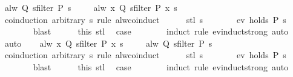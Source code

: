 \begin{isabellebody}
\ {\isachardoublequoteopen}alw\ Q\ {\isacharparenleft}sfilter\ P\ s{\isacharparenright}{\isachardoublequoteclose}\ \isamarkupfalse%
\ {\isacharasterisk}\ \isamarkupfalse%
\ {\isachardoublequoteopen}alw\ {\isacharparenleft}{\isasymlambda}x{\isachardot}\ Q\ {\isacharparenleft}sfilter\ P\ x{\isacharparenright}{\isacharparenright}\ s{\isachardoublequoteclose}\isanewline
\ \ \isamarkupfalse%
\ {\isacharparenleft}coinduction\ arbitrary{\isacharcolon}\ s\ rule{\isacharcolon}\ alw{\isacharunderscore}coinduct{\isacharparenright}\isanewline
\ \ \ \ \isamarkupfalse%
\ {\isacharparenleft}stl\ s{\isacharparenright}\isanewline
\ \ \ \ \isamarkupfalse%
\ \isamarkupfalse%
\ {\isachardoublequoteopen}ev\ {\isacharparenleft}holds\ P{\isacharparenright}\ s{\isachardoublequoteclose}\isanewline
\ \ \ \ \ \ \isamarkupfalse%
\ blast\isanewline
\ \ \ \ \isamarkupfalse%
\ this\ stl\ \isamarkupfalse%
\ {\isacharquery}case\isanewline
\ \ \ \ \ \ \isamarkupfalse%
\ {\isacharparenleft}induct\ rule{\isacharcolon}\ ev{\isacharunderscore}induct{\isacharunderscore}strong{\isacharparenright}\ auto\isanewline
\ \ \isamarkupfalse%
\ auto\isanewline
{}\isamarkupfalse%
\isanewline
\ \ \isamarkupfalse%
\ {\isachardoublequoteopen}alw\ {\isacharparenleft}{\isasymlambda}x{\isachardot}\ Q\ {\isacharparenleft}sfilter\ P\ x{\isacharparenright}{\isacharparenright}\ s{\isachardoublequoteclose}\ \isamarkupfalse%
\ {\isacharasterisk}\ \isamarkupfalse%
\ {\isachardoublequoteopen}alw\ Q\ {\isacharparenleft}sfilter\ P\ s{\isacharparenright}{\isachardoublequoteclose}\isanewline
\ \ \isamarkupfalse%
\ {\isacharparenleft}coinduction\ arbitrary{\isacharcolon}\ s\ rule{\isacharcolon}\ alw{\isacharunderscore}coinduct{\isacharparenright}\isanewline
\ \ \ \ \isamarkupfalse%
\ {\isacharparenleft}stl\ s{\isacharparenright}\isanewline
\ \ \ \ \isamarkupfalse%
\ \isamarkupfalse%
\ {\isachardoublequoteopen}ev\ {\isacharparenleft}holds\ P{\isacharparenright}\ s{\isachardoublequoteclose}\isanewline
\ \ \ \ \ \ \isamarkupfalse%
\ blast\isanewline
\ \ \ \ \isamarkupfalse%
\ this\ stl\ \isamarkupfalse%
\ {\isacharquery}case\isanewline
\ \ \ \ \ \ \isamarkupfalse%
\ {\isacharparenleft}induct\ rule{\isacharcolon}\ ev{\isacharunderscore}induct{\isacharunderscore}strong{\isacharparenright}\ auto\isanewline

\end{isabellebody}
